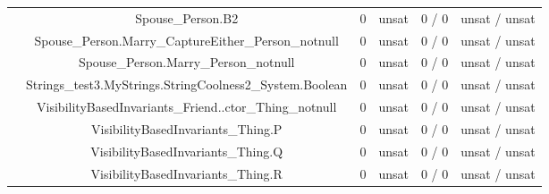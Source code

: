 \begin{table}[htbp]
\begin{minipage}{0.60\textwidth}
{\begin{tabular}[c]{c c!{\vrule width 1.5pt}c|c!{\vrule width 1.5pt}c|c|}
   		& Spouse\_Person.B2    					      & 0    & unsat   & 0  / 0    & unsat / unsat  \\
   		& Spouse\_Person.Marry\_CaptureEither\_Person\_notnull        & 0    & unsat   & 0  / 0    & unsat / unsat  \\
   		& Spouse\_Person.Marry\_Person\_notnull    		      & 0    & unsat   & 0  / 0    & unsat / unsat  \\
   		& Strings\_test3.MyStrings.StringCoolness2\_System.Boolean    & 0    & unsat   & 0  / 0    & unsat / unsat  \\
   		& VisibilityBasedInvariants\_Friend..ctor\_Thing\_notnull     & 0    & unsat   & 0  / 0    & unsat / unsat  \\
   		& VisibilityBasedInvariants\_Thing.P    		      & 0    & unsat   & 0  / 0    & unsat / unsat  \\
   		& VisibilityBasedInvariants\_Thing.Q    		      & 0    & unsat   & 0  / 0    & unsat / unsat  \\
   		& VisibilityBasedInvariants\_Thing.R    		      & 0    & unsat   & 0  / 0    & unsat / unsat  \\

\end{tabular}}
\end{minipage}
\end{table}
